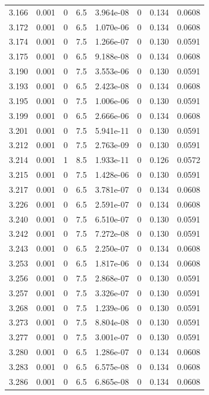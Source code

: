 \documentclass[preview]{standalone}
\begin{document}
{{{{{{{{{\begin{tabular}{L{1.2cm}C{1.2cm} C{0.3cm}C{0.5cm} C{1.4cm}C{1.4cm} C{1.4cm}C{1.4cm}}
  3.166  &  0.001  & 0     & 6.5 &  3.964e-08  & 0  & 0.134 &  0.0608   \\ 
  3.172  &  0.001  & 0     & 6.5 &  1.070e-06  & 0  & 0.134 &  0.0608   \\ 
  3.174  &  0.001  & 0     & 7.5 &  1.266e-07  & 0  & 0.130 &  0.0591   \\ 
  3.175  &  0.001  & 0     & 6.5 &  9.188e-08  & 0  & 0.134 &  0.0608   \\ 
  3.190  &  0.001  & 0     & 7.5 &  3.553e-06  & 0  & 0.130 &  0.0591   \\ 
  3.193  &  0.001  & 0     & 6.5 &  2.423e-08  & 0  & 0.134 &  0.0608   \\ 
  3.195  &  0.001  & 0     & 7.5 &  1.006e-06  & 0  & 0.130 &  0.0591   \\ 
  3.199  &  0.001  & 0     & 6.5 &  2.666e-06  & 0  & 0.134 &  0.0608   \\ 
  3.201  &  0.001  & 0     & 7.5 &  5.941e-11  & 0  & 0.130 &  0.0591   \\ 
  3.212  &  0.001  & 0     & 7.5 &  2.763e-09  & 0  & 0.130 &  0.0591   \\ 
  3.214  &  0.001  & 1     & 8.5 &  1.933e-11  & 0  & 0.126 &  0.0572   \\ 
  3.215  &  0.001  & 0     & 7.5 &  1.428e-06  & 0  & 0.130 &  0.0591   \\ 
  3.217  &  0.001  & 0     & 6.5 &  3.781e-07  & 0  & 0.134 &  0.0608   \\ 
  3.226  &  0.001  & 0     & 6.5 &  2.591e-07  & 0  & 0.134 &  0.0608   \\ 
  3.240  &  0.001  & 0     & 7.5 &  6.510e-07  & 0  & 0.130 &  0.0591   \\ 
  3.242  &  0.001  & 0     & 7.5 &  7.272e-08  & 0  & 0.130 &  0.0591   \\ 
  3.243  &  0.001  & 0     & 6.5 &  2.250e-07  & 0  & 0.134 &  0.0608   \\ 
  3.253  &  0.001  & 0     & 6.5 &  1.817e-06  & 0  & 0.134 &  0.0608   \\ 
  3.256  &  0.001  & 0     & 7.5 &  2.868e-07  & 0  & 0.130 &  0.0591   \\ 
  3.257  &  0.001  & 0     & 7.5 &  3.326e-07  & 0  & 0.130 &  0.0591   \\ 
  3.268  &  0.001  & 0     & 7.5 &  1.239e-06  & 0  & 0.130 &  0.0591   \\ 
  3.273  &  0.001  & 0     & 7.5 &  8.804e-08  & 0  & 0.130 &  0.0591   \\ 
  3.277  &  0.001  & 0     & 7.5 &  3.001e-07  & 0  & 0.130 &  0.0591   \\ 
  3.280  &  0.001  & 0     & 6.5 &  1.286e-07  & 0  & 0.134 &  0.0608   \\ 
  3.283  &  0.001  & 0     & 6.5 &  6.575e-08  & 0  & 0.134 &  0.0608   \\ 
  3.286  &  0.001  & 0     & 6.5 &  6.865e-08  & 0  & 0.134 &  0.0608   \\ 
\hline 
\end{tabular} 

}}}}}}}}}
\end{document}
